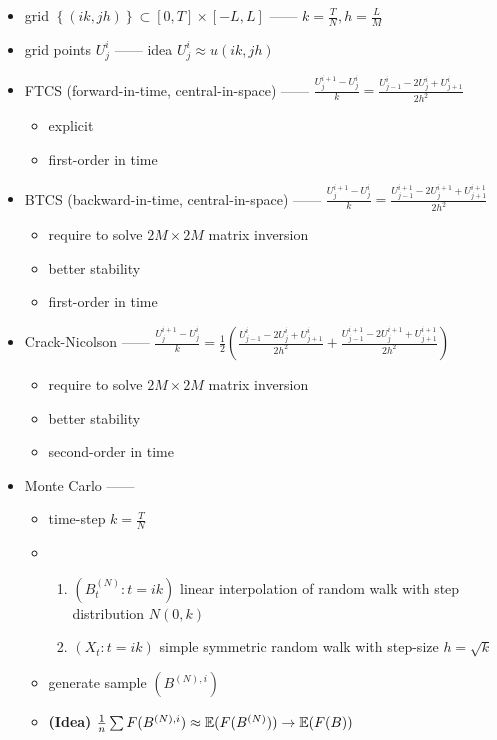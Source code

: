 \begin{itemize}
    \item grid $\left\{ (ik, jh) \right\} \subset [0, T] \times [-L, L]$ ------ $k = \frac{T}{N}, h = \frac{L}{M}$
    \item grid points $U^i_j$ ------ idea $U^i_j \approx u(ik, jh)$
    \item FTCS (forward-in-time, central-in-space) ------ $\frac{U^{i+1}_j - U^i_j}{k} = \frac{U^i_{j-1} - 2U^i_j + U^i_{j+1}}{2h^2}$
    \begin{itemize}
        \item explicit
        \item first-order in time
    \end{itemize}
    \item BTCS (backward-in-time, central-in-space) ------ $\frac{U^{i+1}_j - U^i_j}{k} = \frac{U^{i+1}_{j-1} - 2U^{i+1}_j + U^{i+1}_{j+1}}{2h^2}$
    \begin{itemize}
        \item require to solve $2M \times 2M$ matrix inversion
        \item better stability
        \item first-order in time
    \end{itemize}
    \item Crack-Nicolson ------ $\frac{U^{i+1}_j - U^i_j}{k} = \frac{1}{2}\left( \frac{U^i_{j-1} - 2U^i_j + U^i_{j+1}}{2h^2} + \frac{U^{i+1}_{j-1} - 2U^{i+1}_j + U^{i+1}_{j+1}}{2h^2} \right)$
    \begin{itemize}
        \item require to solve $2M \times 2M$ matrix inversion
        \item better stability
        \item second-order in time
    \end{itemize}
    \item Monte Carlo ------
    \begin{itemize}
        \item time-step $k = \frac{T}{N}$
        \item \begin{enumerate}
                  \item $(B_t^{(N)} : t = ik)$ linear interpolation of random walk with step distribution $N(0, k)$
                  \item $(X_t : t = ik)$ simple symmetric random walk with step-size $h = \sqrt{k}$
        \end{enumerate}
        \item generate sample $(B^{(N),i})$
        \item \textbf{(Idea)} $\frac{1}{n}\sum F(B^{(N), i}) \approx \mathbb{E}(F(B^{(N)})) \rightarrow \mathbb{E}(F(B))$
    \end{itemize}
\end{itemize}

